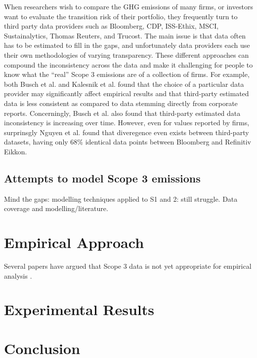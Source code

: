 \documentclass[12pt,twoside]{report}
\begin{document}
When researchers wish to compare the GHG emissions of many firms, or investors want to evaluate the transition risk of their portfolio, they frequently turn to third party data providers such as Bloomberg, CDP, ISS-Ethix, MSCI, Sustainalytics, Thomas Reuters, and Trucost.  The main issue is that data often has to be estimated to fill in the gaps, and unfortunately data providers each use their own methodologies of varying transparency. These different approaches can compound the inconsistency across the data and make it challenging for people to know what the ``real'' Scope 3 emissions are of a collection of firms. For example, both Busch et al. \cite{Busch2022} and Kalesnik et al. \cite{KalesnikVitali2022}  found that the choice of a particular data provider may significantly affect empirical results and that third-party estimated data is less consistent as compared to data stemming directly from corporate reports. Concerningly, Busch et al. also found that third-party estimated data inconsistency is increasing over time.  However, even for values reported by firms, surprinsgly Nguyen et al. \cite{Nguyenetal2023} found that diveregence even exists between third-party datasets, having only 68\% identical data points between Bloomberg and Refinitiv Eikkon. 


\section{Attempts to model Scope 3 emissions}\label{sec:Scope3Modelling}
Mind the gaps: modelling techniques applied to S1 and 2: still struggle. 
Data coverage and modelling/literature. 
\chapter{Empirical Approach}\label{sec:EmpiricalApproach}
Several papers have argued that Scope 3 data is not yet appropriate for empirical analysis \cite{KalesnikVitali2022}. 

\chapter{Experimental Results}


\chapter{Conclusion}




\end{document}
